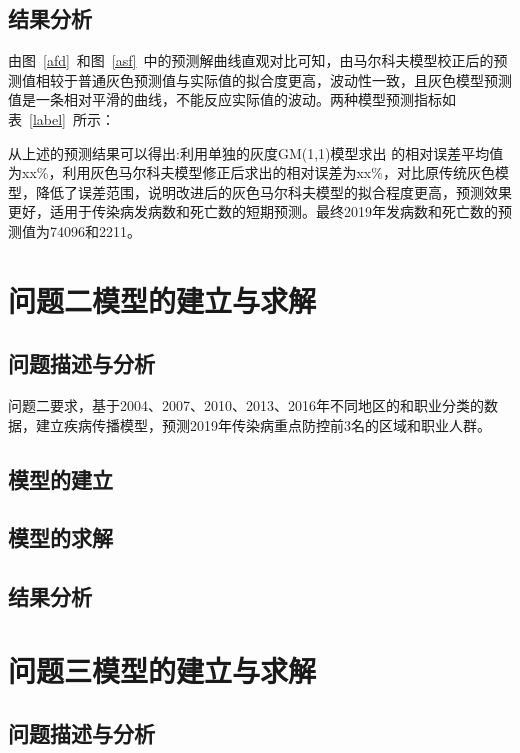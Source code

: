 \documentclass{whutmod}
\begin{document}
   \subsection{结果分析}
	由图~\ref{afd}~和图~\ref{asf}~中的预测解曲线直观对比可知，由马尔科夫模型校正后的预测值相较于普通灰色预测值与实际值的拟合度更高，波动性一致，且灰色模型预测值是一条相对平滑的曲线，不能反应实际值的波动。两种模型预测指标如表~\ref{label}~所示：
	
	从上述的预测结果可以得出:利用单独的灰度GM(1,1)模型求出
	的相对误差平均值为xx\%，利用灰色马尔科夫模型修正后求出的相对误差为xx\%，对比原传统灰色模型，降低了误差范围，说明改进后的灰色马尔科夫模型的拟合程度更高，预测效果更好，适用于传染病发病数和死亡数的短期预测。最终2019年发病数和死亡数的预测值为74096和2211。

	\section{问题二模型的建立与求解}
	\subsection{问题描述与分析}
    问题二要求，基于2004、2007、2010、2013、2016年不同地区的和职业分类的数据，建立疾病传播模型，预测2019年传染病重点防控前3名的区域和职业人群。
    
    
    \subsection{模型的建立}
    
    
    
    
    \subsection{模型的求解}   
    
    
     \subsection{结果分析}
     
     
     
     
     	\section{问题三模型的建立与求解}
     \subsection{问题描述与分析}
    
\end{document}
